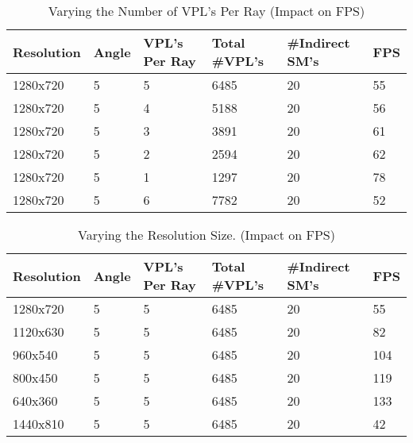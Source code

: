 \begin{table}[h!]
	\caption{Varying the Number of VPL's Per Ray (Impact on FPS)}
	\begin{center}
	    \begin{tabular}{ | l | l | l | l | l | l |}
	    \hline
	    Resolution & Angle & VPL's Per Ray & Total \#VPL's & \#Indirect SM's & FPS\\ \hline
	    1280x720 & 5 & 5 & 6485 & 20 & 55\\ \hline
	    1280x720 & 5 & 4 & 5188 & 20 & 56\\ \hline
	    1280x720 & 5 & 3 & 3891 & 20 & 61\\ \hline
	    1280x720 & 5 & 2 & 2594 & 20 & 62\\ \hline
	    1280x720 & 5 & 1 & 1297 & 20 & 78\\ \hline
	    1280x720 & 5 & 6 & 7782 & 20 & 52\\ \hline
	    \end{tabular}
	\end{center}
	\label{table:5.2}
\end{table}

\begin{table}[h!]
	\caption{Varying the Resolution Size. (Impact on FPS)}
	\begin{center}
	    \begin{tabular}{ | l | l | l | l | l | l |}
	    \hline
	    Resolution & Angle & VPL's Per Ray & Total \#VPL's & \#Indirect SM's & FPS\\ \hline
	    1280x720 & 5 & 5 & 6485 & 20 & 55\\ \hline
	    1120x630 & 5 & 5 & 6485 & 20 & 82\\ \hline
	    960x540 & 5 & 5 & 6485 & 20 & 104\\ \hline
	    800x450 & 5 & 5 & 6485 & 20 & 119\\ \hline
	    640x360 & 5 & 5 & 6485 & 20 & 133\\ \hline
	    1440x810 & 5 & 5 & 6485 & 20 & 42\\ \hline
	    \end{tabular}
	\end{center}
	\label{table:5.3}
\end{table}

